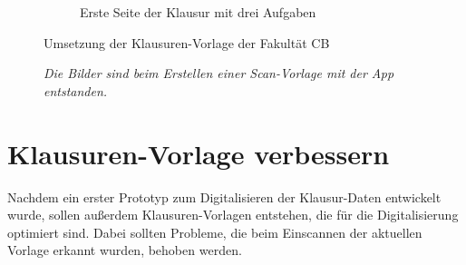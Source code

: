 \documentclass[notables, nomenclature, oneside, 150]{HSMW-Thesis}
\begin{document}
\begin{figure}[th]
\begin{subfigure}[t]{0.48\textwidth}
        	\caption{Erste Seite der Klausur mit drei Aufgaben}
        	\label{fig:seite2}
    	\end{subfigure}
    	\caption{Umsetzung der Klausuren-Vorlage der Fakultät CB}
    	\caption*{\textit{Die Bilder sind beim Erstellen einer Scan-Vorlage mit der App entstanden.}}
    	\label{fig:klausur}
	\end{figure}
	
	\section{Klausuren-Vorlage verbessern}
	Nachdem ein erster Prototyp zum Digitalisieren der Klausur-Daten entwickelt wurde, sollen außerdem Klausuren-Vorlagen entstehen, die für die Digitalisierung optimiert sind. Dabei sollten Probleme, die beim Einscannen der aktuellen Vorlage erkannt wurden, behoben werden. 
	
\end{document}

